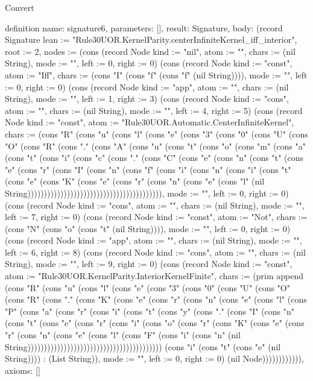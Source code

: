 \begin{lexlean}{Convert}
\begin{semanticmodule}
definition{
  name: signature6,
  parameters: [],
  result: Signature,
  body: (record Signature {lean := "Rule30UOR.KernelParity.centerInfiniteKernel_iff_interior", root := 2, nodes := (cons (record Node {kind := "nil", atom := "", chars := (nil String), mode := "", left := 0, right := 0}) (cons (record Node {kind := "const", atom := "Iff", chars := (cons "I" (cons "f" (cons "f" (nil String)))), mode := "", left := 0, right := 0}) (cons (record Node {kind := "app", atom := "", chars := (nil String), mode := "", left := 1, right := 3}) (cons (record Node {kind := "cons", atom := "", chars := (nil String), mode := "", left := 4, right := 5}) (cons (record Node {kind := "const", atom := "Rule30UOR.Automatic.CenterInfiniteKernel", chars := (cons "R" (cons "u" (cons "l" (cons "e" (cons "3" (cons "0" (cons "U" (cons "O" (cons "R" (cons "." (cons "A" (cons "u" (cons "t" (cons "o" (cons "m" (cons "a" (cons "t" (cons "i" (cons "c" (cons "." (cons "C" (cons "e" (cons "n" (cons "t" (cons "e" (cons "r" (cons "I" (cons "n" (cons "f" (cons "i" (cons "n" (cons "i" (cons "t" (cons "e" (cons "K" (cons "e" (cons "r" (cons "n" (cons "e" (cons "l" (nil String))))))))))))))))))))))))))))))))))))))))), mode := "", left := 0, right := 0}) (cons (record Node {kind := "cons", atom := "", chars := (nil String), mode := "", left := 7, right := 0}) (cons (record Node {kind := "const", atom := "Not", chars := (cons "N" (cons "o" (cons "t" (nil String)))), mode := "", left := 0, right := 0}) (cons (record Node {kind := "app", atom := "", chars := (nil String), mode := "", left := 6, right := 8}) (cons (record Node {kind := "cons", atom := "", chars := (nil String), mode := "", left := 9, right := 0}) (cons (record Node {kind := "const", atom := "Rule30UOR.KernelParity.InteriorKernelFinite", chars := (prim append (cons "R" (cons "u" (cons "l" (cons "e" (cons "3" (cons "0" (cons "U" (cons "O" (cons "R" (cons "." (cons "K" (cons "e" (cons "r" (cons "n" (cons "e" (cons "l" (cons "P" (cons "a" (cons "r" (cons "i" (cons "t" (cons "y" (cons "." (cons "I" (cons "n" (cons "t" (cons "e" (cons "r" (cons "i" (cons "o" (cons "r" (cons "K" (cons "e" (cons "r" (cons "n" (cons "e" (cons "l" (cons "F" (cons "i" (cons "n" (nil String))))))))))))))))))))))))))))))))))))))))) (cons "i" (cons "t" (cons "e" (nil String)))) : (List String)), mode := "", left := 0, right := 0}) (nil Node)))))))))))}),
  axioms: []
}


\end{semanticmodule}
\end{lexlean}
